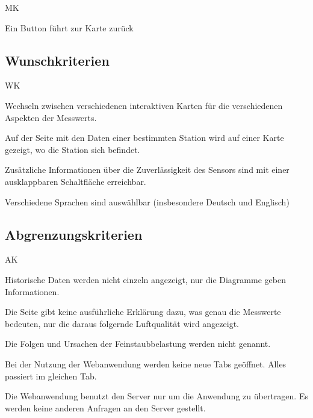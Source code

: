 \begin{Kriterien}{MK}	
	\item Ein Button führt zur Karte zurück
 
\end{Kriterien}

\newpage
\subsection{Wunschkriterien}
\setcounter{counter}{10}
\begin{Kriterien}{WK}

	\item Wechseln zwischen verschiedenen interaktiven Karten für die verschiedenen Aspekten der \glspl{Messwert}.

	\item Auf der Seite mit den Daten einer bestimmten \gls{Station} wird auf einer Karte gezeigt, wo die \gls{Station} sich befindet. 

	\item Zusätzliche Informationen über die Zuverlässigkeit des Sensors sind mit einer ausklappbaren Schaltfläche erreichbar.

	\item Verschiedene Sprachen sind auswählbar (insbesondere Deutsch und Englisch)

\end{Kriterien}

\subsection{Abgrenzungskriterien}
\setcounter{counter}{10}
\begin{Kriterien}{AK}

	\item Historische Daten werden nicht einzeln angezeigt, nur die Diagramme geben Informationen.
	
	\item Die Seite gibt keine ausführliche Erklärung dazu, was genau die Messwerte bedeuten, nur die daraus folgernde Luftqualität wird angezeigt. 
	
	\item Die Folgen und Ursachen der Feinstaubbelastung werden nicht genannt.
	
	\item Bei der Nutzung der Webanwendung werden keine neue Tabs geöffnet. Alles passiert im gleichen Tab.
	
	\item Die Webanwendung benutzt den Server nur um die Anwendung zu übertragen. 
		Es werden keine anderen Anfragen an den Server gestellt.
	
\end{Kriterien}
